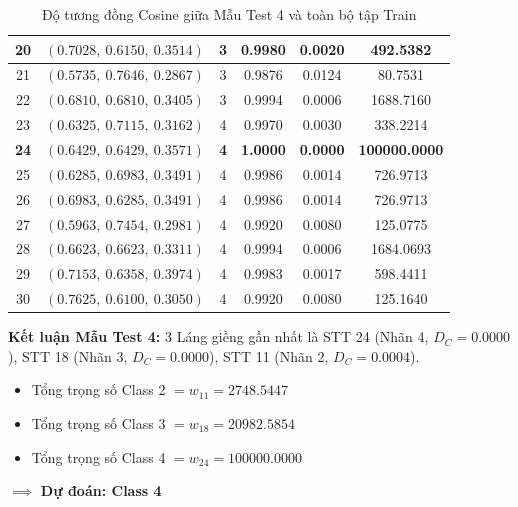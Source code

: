\documentclass[12pt,a4paper]{article}
\begin{document}
\begin{table}[H]
{\begin{tabular}{|c|c|c|c|c|c|}
20 & $(0.7028,\ 0.6150,\ 0.3514)$ & 3 & 0.9980 & 0.0020 & 492.5382 \\ \hline
21 & $(0.5735,\ 0.7646,\ 0.2867)$ & 3 & 0.9876 & 0.0124 & 80.7531 \\ \hline
22 & $(0.6810,\ 0.6810,\ 0.3405)$ & 3 & 0.9994 & 0.0006 & 1688.7160 \\ \hline
23 & $(0.6325,\ 0.7115,\ 0.3162)$ & 4 & 0.9970 & 0.0030 & 338.2214 \\ \hline
\textbf{24} & \textbf{$(0.6429,\ 0.6429,\ 0.3571)$} & \textbf{4} & \textbf{1.0000} & \textbf{0.0000} & \textbf{100000.0000} \\ \hline
25 & $(0.6285,\ 0.6983,\ 0.3491)$ & 4 & 0.9986 & 0.0014 & 726.9713 \\ \hline
26 & $(0.6983,\ 0.6285,\ 0.3491)$ & 4 & 0.9986 & 0.0014 & 726.9713 \\ \hline
27 & $(0.5963,\ 0.7454,\ 0.2981)$ & 4 & 0.9920 & 0.0080 & 125.0775 \\ \hline
28 & $(0.6623,\ 0.6623,\ 0.3311)$ & 4 & 0.9994 & 0.0006 & 1684.0693 \\ \hline
29 & $(0.7153,\ 0.6358,\ 0.3974)$ & 4 & 0.9983 & 0.0017 & 598.4411 \\ \hline
30 & $(0.7625,\ 0.6100,\ 0.3050)$ & 4 & 0.9920 & 0.0080 & 125.1640 \\ \hline
\end{tabular}%
}
\caption{Độ tương đồng Cosine giữa Mẫu Test 4 và toàn bộ tập Train}
\end{table}
 
\textbf{Kết luận Mẫu Test 4:} 3 Láng giềng gần nhất là STT 24 (Nhãn 4, $D_C=0.0000$), STT 18 (Nhãn 3, $D_C=0.0000$), STT 11 (Nhãn 2, $D_C=0.0004$).
\begin{itemize}
    \item Tổng trọng số Class 2 $= w_{11} = 2748.5447$
    \item Tổng trọng số Class 3 $= w_{18} = 20982.5854$
    \item Tổng trọng số Class 4 $= w_{24} = 100000.0000$
\end{itemize}
$\implies$ \textbf{Dự đoán: Class 4}
\end{document}
